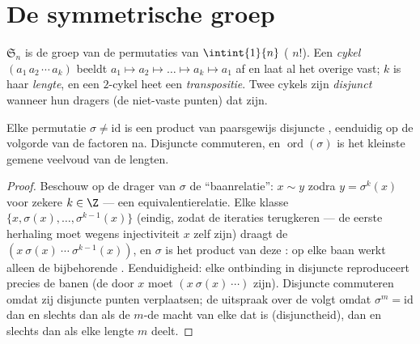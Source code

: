 \section{De symmetrische groep}

\begin{definition}\label{def:b2:structures:sn}
$\mathfrak{S}_n$ is de groep van de permutaties van $\intint{1}{n}$
( $n!$). Een \emph{cykel}
$(a_1\,a_2\,\cdots\,a_k)$ beeldt $a_1 \mapsto a_2 \mapsto \dots
\mapsto a_k \mapsto a_1$ af en laat al het overige vast; $k$ is
haar \emph{lengte}, en een $2$-cykel heet een
\emph{transpositie}. Twee cykels zijn
\emph{disjunct} wanneer hun dragers (de niet-vaste punten) dat
zijn.
\end{definition}

\begin{theorem}\label{thm:b2:structures:cycles}
Elke permutatie $\sigma \neq \mathrm{id}$ is een product van
paarsgewijs disjuncte , eenduidig op de volgorde van de
factoren na. Disjuncte  commuteren, en
$\operatorname{ord}(\sigma)$ is het kleinste gemene veelvoud van
de lengten.
\end{theorem}

\begin{proof}
Beschouw op de drager van $\sigma$ de ``baanrelatie'': $x \sim y$
zodra $y = \sigma^k(x)$ voor zekere $k \in \Z$ --- een
equivalentierelatie. Elke klasse $\{x, \sigma(x), \dots,
\sigma^{k-1}(x)\}$ (eindig, zodat de iteraties terugkeren --- de
eerste herhaling moet wegens injectiviteit $x$ zelf zijn) draagt
de  $(x\ \sigma(x)\ \cdots\ \sigma^{k-1}(x))$, en $\sigma$ is
het product van deze : op elke baan werkt alleen de
bijbehorende . Eenduidigheid: elke ontbinding in disjuncte
 reproduceert precies de banen (de  door $x$ moet $(x\
\sigma(x)\ \cdots)$ zijn). Disjuncte  commuteren omdat zij
disjuncte punten verplaatsen; de uitspraak over de \omterm{def:b2:structures:generated}{orde} volgt
omdat $\sigma^m = \mathrm{id}$ dan en slechts dan als de $m$-de
macht van elke  dat is (disjunctheid), dan en slechts dan als
elke lengte $m$ deelt.
\end{proof}

